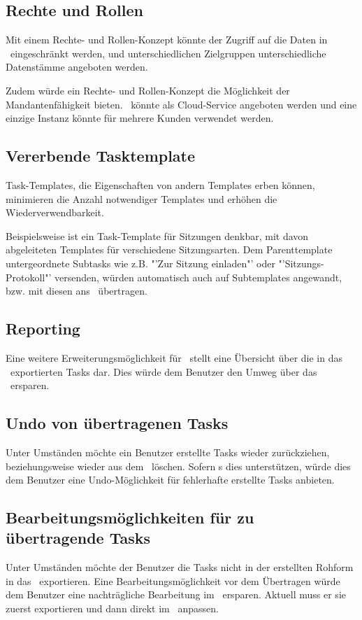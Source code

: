 		\subsection{Rechte und Rollen}
			Mit einem Rechte- und Rollen-Konzept könnte der Zugriff auf die Daten in \eeppi\ eingeschränkt werden,
			und unterschiedlichen Zielgruppen unterschiedliche Datenstämme angeboten werden.
			
			Zudem würde ein Rechte- und Rollen-Konzept die Möglichkeit der Mandantenfähigkeit bieten.
			\eeppi\ könnte als Cloud-Service angeboten werden und eine einzige Instanz könnte für mehrere Kunden verwendet werden.
			
		
		\subsection{Vererbende Tasktemplate}
			Task-Templates, die Eigenschaften von andern Templates erben können, 
			minimieren die Anzahl notwendiger Templates und erhöhen die Wiederverwendbarkeit.
			
			Beispielsweise ist ein Task-Template für Sitzungen denkbar, mit
			davon abgeleiteten Templates für verschiedene Sitzungsarten.
			Dem Parenttemplate untergeordnete Subtasks wie z.B. "'Zur Sitzung einladen"' oder "'Sitzungs-Protokoll"' versenden, würden automatisch auch auf Subtemplates angewandt, bzw. mit diesen ans \ppt\ übertragen.
			
		
		\subsection{Reporting}
			Eine weitere Erweiterungsmöglichkeit für \eeppi\ stellt eine Übersicht über die in das \ppt\ exportierten Tasks dar.
			Dies würde dem Benutzer den Umweg über das \ppt\ ersparen.
		
		
		\subsection{Undo von übertragenen Tasks}
			Unter Umständen möchte ein Benutzer erstellte Tasks wieder zurückziehen,
			beziehungsweise wieder aus dem \ppt\ löschen.
			Sofern \ppt s dies unterstützen, würde dies dem Benutzer eine Undo-Möglichkeit für fehlerhafte erstellte Tasks anbieten.
		
		
		\subsection{Bearbeitungsmöglichkeiten für zu übertragende Tasks}
			Unter Umständen möchte der Benutzer die Tasks nicht in der erstellten Rohform in das \ppt\ exportieren.
			Eine Bearbeitungsmöglichkeit vor dem Übertragen würde dem Benutzer eine nachträgliche Bearbeitung im \ppt\ ersparen.
			Aktuell muss er sie zuerst exportieren und dann direkt im \ppt\ anpassen.
			
